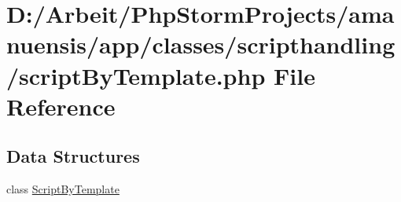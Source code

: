 \hypertarget{a00102}{}\section{D\+:/\+Arbeit/\+Php\+Storm\+Projects/amanuensis/app/classes/scripthandling/script\+By\+Template.php File Reference}
\label{a00102}
\subsection*{Data Structures}
\begin{DoxyCompactItemize}
\item 
class \hyperlink{a00041}{Script\+By\+Template}
\end{DoxyCompactItemize}
